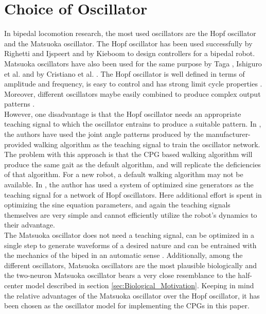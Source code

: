 \documentclass[12pt,twoside]{article}
\theoremstyle{plain}
\theoremstyle{definition}
\theoremstyle{remark}
\newcommand{\forceindent}{\leavevmode{\parindent=2em\indent}}
\begin{document}
\section{Choice of Oscillator}
\label{sec:Choice_of_Oscillator}
In bipedal locomotion research, the most used oscillators are the Hopf oscillator and the Matsuoka oscillator. The Hopf oscillator has been used successfully by Righetti and Ijspeert \cite{Righetti2006} and by Kieboom \cite{Kieboom2009} to design controllers for a bipedal robot. Matsuoka oscillators have also been used for the same purpose by Taga \cite{Taga1991}, Ishiguro et al. \cite{Ishiguro2003} and by Cristiano et al. \cite{cristiano2014locomotion}. The Hopf oscillator is well defined in terms of amplitude and frequency, is easy to control and has strong limit cycle properties \cite{Kieboom2009}. Moreover, different oscillators maybe easily combined to produce complex output patterns \cite{Righetti2006}. \\
\forceindent However, one disadvantage is that the Hopf oscillator needs an appropriate teaching signal to which the oscillator entrains to produce a suitable pattern. In \cite{Righetti2006}, the authors have used the joint angle patterns produced by the manufacturer-provided walking algorithm as the teaching signal to train the oscillator network. The problem with this approach is that the CPG based walking algorithm will produce the same gait as the default algorithm, and will replicate the deficiencies of that algorithm. For a new robot, a default walking algorithm may not be  available. In \cite{Kieboom2009}, the author has used a system of optimized sine generators as the teaching signal for a network of Hopf oscillators. Here additional effort is spent in optimizing the sine equation parameters, and again the teaching signals themselves are very simple and cannot efficiently utilize the robot's dynamics to their advantage.\\
\forceindent The Matsuoka oscillator does not need a teaching signal, can be optimized in a single step to generate waveforms of a desired nature and can be entrained with the mechanics of the biped in an automatic sense \cite{Kieboom2009}. Additionally, among the different oscillators, Matsuoka oscillators are the most plausible biologically and the two-neuron Matsuoka oscillator \cite{Matsuoka1987} bears a very close resemblance to the half-center model described in section \ref{sec:Biological_Motivation}. Keeping in mind the relative advantages of the Matsuoka oscillator over the Hopf oscillator, it has been chosen as the oscillator model for implementing the CPGs in this paper.
\end{document}
